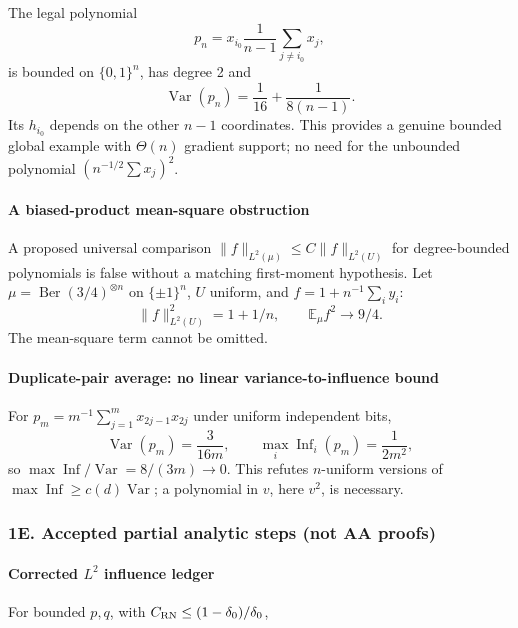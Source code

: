 The legal polynomial
\[p_n=x_{i_0}\frac1{n-1}\sum_{j\ne i_0}x_j,\]
is bounded on \(\{0,1\}^n\), has degree 2 and
\[\operatorname{Var}(p_n)=\frac1{16}+\frac1{8(n-1)}.\]
Its \(h_{i_0}\) depends on the other \(n-1\) coordinates. This provides a genuine bounded global example with \(\Theta(n)\) gradient support; no need for the unbounded polynomial \((n^{-1/2}\sum x_j)^2\).

\paragraph{A biased-product mean-square obstruction}\label{a-biased-product-mean-square-obstruction}

A proposed universal comparison \(\|f\|_{L^2(\mu)}\le C\|f\|_{L^2(U)}\) for degree-bounded polynomials is false without a matching first-moment hypothesis. Let \(\mu=\operatorname{Ber}(3/4)^{\otimes n}\) on \(\{\pm1\}^n\), \(U\) uniform, and \(f=1+n^{-1}\sum_i y_i\):
\[\|f\|_{L^2(U)}^2=1+1/n,\qquad
\mathbb E_\mu f^2\to9/4.\]
The mean-square term cannot be omitted.

\paragraph{Duplicate-pair average: no linear variance-to-influence bound}\label{duplicate-pair-average-no-linear-variance-to-influence-bound}

For \(p_m=m^{-1}\sum_{j=1}^m x_{2j-1}x_{2j}\) under uniform independent bits,
\[\operatorname{Var}(p_m)=\frac3{16m},\qquad
\max_i\operatorname{Inf}_i(p_m)=\frac1{2m^2},\]
so \(\max\operatorname{Inf}/\operatorname{Var}=8/(3m)\to0\). This refutes \(n\)-uniform versions of \(\max\operatorname{Inf}\ge c(d)\operatorname{Var}\); a polynomial in \(v\), here \(v^2\), is necessary.

\subsubsection{1E. Accepted partial analytic steps (not AA proofs)}\label{e.-accepted-partial-analytic-steps-not-aa-proofs}

\paragraph{\texorpdfstring{Corrected \(L^2\) influence ledger}{Corrected L\^{}2 influence ledger}}\label{corrected-l2-influence-ledger}

For bounded \(p,q\), with \(C_{\rm RN}\le(1-\delta_0)/\delta_0\),

